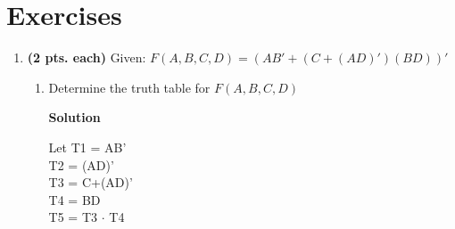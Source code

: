 \section{Exercises}
\label{section:representationsExercises}
\graphicspath{ {./chapter02/FigHw} }

\begin{enumerate}
    \item \textbf{(2 pts. each)} Given: $F(A,B,C,D) = (AB' + (C+(AD)')(BD))'$

        \begin{enumerate}
            \item Determine the truth table for $F(A,B,C,D)$

                \begin{onlysolution}  \textbf{Solution} \itshape

                    Let T1 = AB'\\
                    T2 = (AD)'\\
                    T3 = C+(AD)'\\
                    T4 = BD\\
                    T5 = T3 $\cdot$ T4\\


\end{onlysolution}
\end{enumerate}
\end{enumerate}
